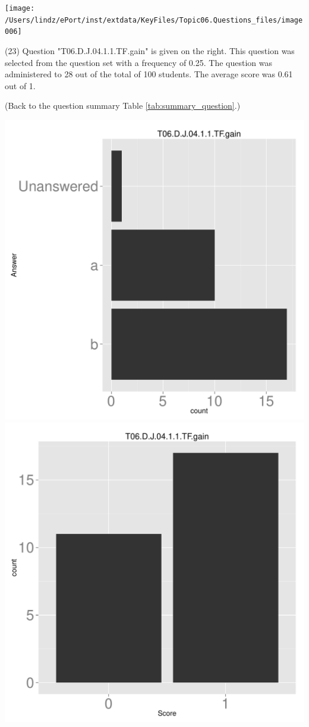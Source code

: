 \documentclass[12pt,nohyper]{tufte-handout}\usepackage[]{graphicx}\usepackage[]{color}
\begin{document}
\vspace{5cm}\begin{marginfigure}\texttt{[image: /Users/lindz/ePort/inst/extdata/KeyFiles/Topic06.Questions\_files/image006]}\end{marginfigure}\vspace{-5cm} (23) Question "T06.D.J.04.1.1.TF.gain" is given on the right. This question was selected from the question set with a frequency of 0.25. The question was administered to 28 out of the total of 100 students. The average score was 0.61 out of 1.

 (Back to the question summary Table \ref{tab:summary_question}.)

\begin{center} \includegraphics[width=.45\linewidth]{Topic06_23_answer} \includegraphics[width=.45\linewidth]{Topic06_23_score} \end{center} 
\end{document}

